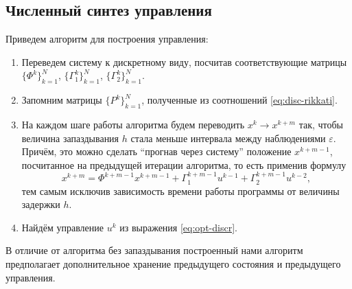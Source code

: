 \subsection{Численный синтез управления}

Приведем алгоритм для построения управления:
\begin{enumerate}
        \item Переведем систему к дискретному виду, посчитав соответствующие матрицы 
        $\{\Phi^k\}_{k=1}^{N}$, $\{\Gamma_1^k\}_{k=1}^{N}$, $\{\Gamma_2^k\}_{k=1}^{N}$.

        \item Запомним матрицы $\{P^k\}_{k=1}^N$, полученные из соотношений \eqref{eq:disc-rikkati}.

        \item На каждом шаге работы алгоритма будем переводить $x^k \longrightarrow x^{k+m}$ так, чтобы величина запаздывания $h$ стала меньше интервала между наблюдениями $\varepsilon$. Причём, это можно сделать ``прогнав через систему'' положение $x^{k+m-1}$, посчитанное на предыдущей итерации алгоритма, то есть применив формулу
$$
        x^{k+m} = \Phi^{k+m-1}x^{k+m-1} + \Gamma_1^{k+m-1}u^{k-1} + \Gamma_2^{k+m-1}u^{k-2},
$$
        тем самым исключив зависимость времени работы программы от величины задержки $h$.

        \item Найдём управление $u^k$ из выражения \eqref{eq:opt-discr}.
\end{enumerate}
В отличие от алгоритма без запаздывания построенный нами алгоритм предполагает дополнительное хранение предыдущего состояния и предыдущего управления.